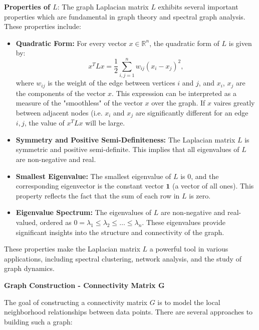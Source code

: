 \documentclass[unicode,11pt,a4paper,oneside,numbers=endperiod,openany]{scrartcl}
\begin{document}
\textbf{Properties of \( L \)}:
The graph Laplacian matrix \( L \) exhibits several important properties which are fundamental in graph theory and spectral graph analysis. These properties include:

\begin{itemize}
    \item \textbf{Quadratic Form:} For every vector \( x \in \mathbb{R}^n \), the quadratic form of \( L \) is given by:
    \[
    x^T L x = \frac{1}{2} \sum_{i,j=1}^{n} w_{ij} (x_i - x_j)^2,
    \]
    where \( w_{ij} \) is the weight of the edge between vertices \( i \) and \( j \), and \( x_i \), \( x_j \) are the components of the vector \( x \).
    \newline This expression can be interpreted as a measure of the "smoothless" of the vector $x$ over the graph. If $x$ vaires greatly between adjacent nodes (i.e. $x_i$ and $x_j$ are significantly different for an edge ${i,j}$, the value of $x^TLx$ will be large.

    \item \textbf{Symmetry and Positive Semi-Definiteness:} The Laplacian matrix \( L \) is symmetric and positive semi-definite. This implies that all eigenvalues of \( L \) are non-negative and real.

    \item \textbf{Smallest Eigenvalue:} The smallest eigenvalue of \( L \) is \( 0 \), and the corresponding eigenvector is the constant vector \( \mathbf{1} \) (a vector of all ones). This property reflects the fact that the sum of each row in \( L \) is zero.

    \item \textbf{Eigenvalue Spectrum:} The eigenvalues of \( L \) are non-negative and real-valued, ordered as \( 0 = \lambda_1 \leq \lambda_2 \leq \ldots \leq \lambda_n \). These eigenvalues provide significant insights into the structure and connectivity of the graph.
\end{itemize}

These properties make the Laplacian matrix \( L \) a powerful tool in various applications, including spectral clustering, network analysis, and the study of graph dynamics.
\newline \newline

\textbf{Graph Construction - Connectivity Matrix G}

The goal of constructing a connectivity matrix \( G \) is to model the local neighborhood relationships between data points. There are several approaches to building such a graph:
\end{document}
